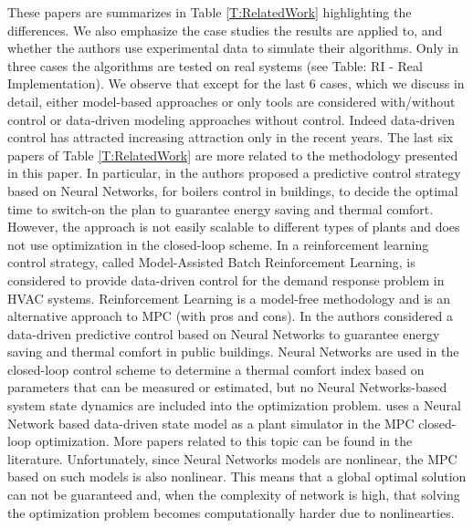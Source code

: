 \textcolor[rgb]{0,0,1}{
These papers are summarizes in Table \ref{T:RelatedWork} highlighting the differences.
We also emphasize the case studies the results are applied to, and whether the authors use experimental data to simulate their algorithms.
Only in three cases the algorithms are tested on real systems (see Table: RI - Real Implementation).
We observe that except for the last 6 cases, which we discuss in detail, either model-based approaches or only tools are considered with/without control or data-driven modeling approaches without control.
Indeed data-driven control has attracted increasing attraction only in the recent years.
The last six papers of Table \ref{T:RelatedWork} are more related to the methodology presented in this paper.
In particular, in \cite{Macarulla2017} the authors proposed a predictive control strategy based on Neural Networks, for boilers control in buildings, to decide the optimal time to switch-on the plan to guarantee energy saving and thermal comfort.
However, the approach is not easily scalable to different types of plants and does not use optimization in the closed-loop scheme.
In \cite{Costanzo2016} a reinforcement learning control strategy, called Model-Assisted Batch Reinforcement Learning, is considered to provide data-driven control for the demand response problem in HVAC systems.
Reinforcement Learning is a model-free methodology and is an alternative approach to MPC \cite{Ernst2009TSMC} (with pros and cons).
In \cite{Ferreira2012} the authors considered a data-driven predictive control based on Neural Networks to guarantee energy saving and  thermal comfort in public buildings.
Neural Networks are used in the closed-loop control scheme to determine a thermal comfort index based on parameters that can be measured or estimated, but no Neural Networks-based system state dynamics are included into the optimization problem.
\cite{Afram2017} uses a Neural Network based data-driven state model as a plant simulator in the MPC closed-loop optimization.
More papers related to this topic can be found in the literature.
Unfortunately, since Neural Networks models are nonlinear, the MPC based on such models is also nonlinear.
This means that a global optimal solution can not be guaranteed and, when the complexity of network is high, that solving the optimization problem becomes computationally harder due to nonlinearties.
}
